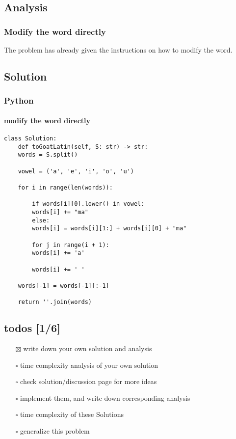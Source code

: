 \documentclass[12pt]{article}
\begin{document}
\subsection{Analysis}
\label{sec:orgc171063}
\subsubsection{Modify the word directly}
\label{sec:orgf9c53e5}
The problem has already given the instructions on how to modify the word.
\subsection{Solution}
\label{sec:org16586fa}
\subsubsection{Python}
\label{sec:orga09d522}
\paragraph{modify the word directly}
\label{sec:orgb52fcf7}
\begin{verbatim}
class Solution:
    def toGoatLatin(self, S: str) -> str:
	words = S.split()

	vowel = ('a', 'e', 'i', 'o', 'u')

	for i in range(len(words)):

	    if words[i][0].lower() in vowel:
		words[i] += "ma"
	    else:
		words[i] = words[i][1:] + words[i][0] + "ma"

	    for j in range(i + 1):
		words[i] += 'a'

	    words[i] += ' '

	words[-1] = words[-1][:-1]

	return ''.join(words)
\end{verbatim}
\subsection{todos [1/6]}
\label{sec:org35645ab}
\begin{itemize}
\item[{$\boxtimes$}] write down your own solution and analysis
\item[{$\square$}] time complexity analysis of your own solution
\item[{$\square$}] check solution/discussion page for more ideas
\item[{$\square$}] implement them, and write down corresponding analysis
\item[{$\square$}] time complexity of these Solutions
\item[{$\square$}] generalize this problem
\end{itemize}
\end{document}
